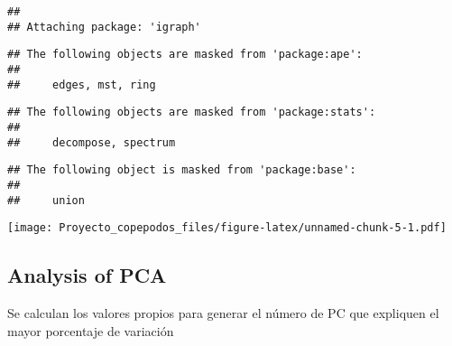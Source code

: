 \documentclass[]{article}
\newenvironment{Shaded}{\begin{snugshade}}{\end{snugshade}}
\newcommand{\DataTypeTok}[1]{\textcolor[rgb]{0.13,0.29,0.53}{#1}}
\newcommand{\DecValTok}[1]{\textcolor[rgb]{0.00,0.00,0.81}{#1}}
\newcommand{\KeywordTok}[1]{\textcolor[rgb]{0.13,0.29,0.53}{\textbf{#1}}}
\newcommand{\NormalTok}[1]{#1}
\newcommand{\OperatorTok}[1]{\textcolor[rgb]{0.81,0.36,0.00}{\textbf{#1}}}
\newcommand{\OtherTok}[1]{\textcolor[rgb]{0.56,0.35,0.01}{#1}}
\newcommand{\StringTok}[1]{\textcolor[rgb]{0.31,0.60,0.02}{#1}}
\begin{document}
\begin{verbatim}
## 
## Attaching package: 'igraph'
\end{verbatim}

\begin{verbatim}
## The following objects are masked from 'package:ape':
## 
##     edges, mst, ring
\end{verbatim}

\begin{verbatim}
## The following objects are masked from 'package:stats':
## 
##     decompose, spectrum
\end{verbatim}

\begin{verbatim}
## The following object is masked from 'package:base':
## 
##     union
\end{verbatim}

\begin{Shaded}
\end{Shaded}

\texttt{[image: Proyecto\_copepodos\_files/figure-latex/unnamed-chunk-5-1.pdf]}

\hypertarget{analysis-of-pca}{%
\subsection{Analysis of PCA}\label{analysis-of-pca}}

Se calculan los valores propios para generar el número de PC que
expliquen el mayor porcentaje de variación
\end{document}
